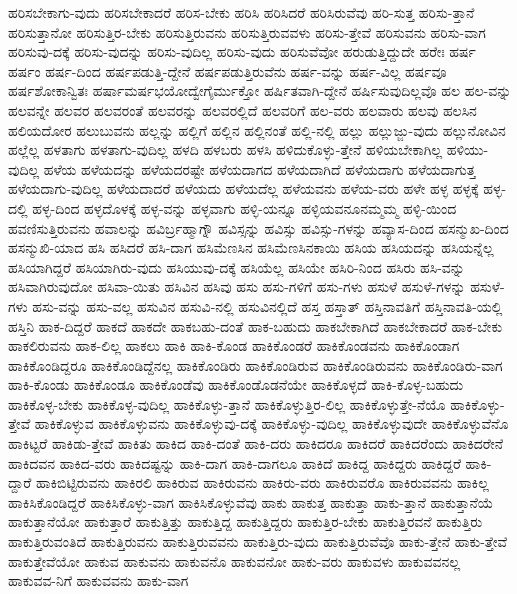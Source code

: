 {ಹರಿಸಬೇಕಾಗು-ವುದು
ಹರಿಸಬೇಕಾದರೆ
ಹರಿಸ-ಬೇಕು
ಹರಿಸಿ
ಹರಿಸಿದರೆ
ಹರಿಸಿರುವೆವು
ಹರಿ-ಸುತ್ತ
ಹರಿಸು-ತ್ತಾನೆ
ಹರಿಸುತ್ತಾನೋ
ಹರಿಸುತ್ತಿರ-ಬೇಕು
ಹರಿಸುತ್ತಿರುವನು
ಹರಿಸುತ್ತಿರುವವಳು
ಹರಿಸು-ತ್ತೇವೆ
ಹರಿಸುವನು
ಹರಿಸು-ವಾಗ
ಹರಿಸುವು-ದಕ್ಕೆ
ಹರಿಸು-ವುದನ್ನು
ಹರಿಸು-ವುದಿಲ್ಲ
ಹರಿಸು-ವುದು
ಹರಿಸುವೆವೋ
ಹರುಡುತ್ತಿದ್ದುದೇ
ಹರೇಃ
ಹರ್ಷ
ಹರ್ಷಂ
ಹರ್ಷ-ದಿಂದ
ಹರ್ಷಪಡುತ್ತಿ-ದ್ದೇನೆ
ಹರ್ಷಪಡುತ್ತಿರುವೆನು
ಹರ್ಷ-ವನ್ನು
ಹರ್ಷ-ವಿಲ್ಲ
ಹರ್ಷವೂ
ಹರ್ಷಶೋಕಾನ್ವಿತಃ
ಹರ್ಷಾಮರ್ಷಭಯೋದ್ವೇಗೈರ್ಮುಕ್ತೋ
ಹರ್ಷಿತವಾಗಿ-ದ್ದೇನೆ
ಹರ್ಷಿಸುವುದಿಲ್ಲವೊ
ಹಲ
ಹಲ-ವನ್ನು
ಹಲವನ್ನೇ
ಹಲವರ
ಹಲವರಂತೆ
ಹಲವರನ್ನು
ಹಲವರಲ್ಲಿದೆ
ಹಲವರಿಗೆ
ಹಲ-ವರು
ಹಲವಾರು
ಹಲವು
ಹಲಸಿನ
ಹಲಿಯದೋರ
ಹಲುಬುವನು
ಹಲ್ಲನ್ನು
ಹಲ್ಲಿಗೆ
ಹಲ್ಲಿನ
ಹಲ್ಲಿನಂತೆ
ಹಲ್ಲಿ-ನಲ್ಲಿ
ಹಲ್ಲು
ಹಲ್ಲುಜ್ಜು-ವುದು
ಹಲ್ಲುನೋವಿನ
ಹಲ್ಲೆಲ್ಲ
ಹಳತಾಗು
ಹಳತಾಗು-ವುದಿಲ್ಲ
ಹಳದಿ
ಹಳಬರು
ಹಳಸಿ
ಹಳಿದುಕೊಳ್ಳು-ತ್ತೇನೆ
ಹಳಿಯಬೇಕಾಗಿಲ್ಲ
ಹಳಿಯು-ವುದಿಲ್ಲ
ಹಳೆಯ
ಹಳೆಯದನ್ನು
ಹಳೆಯದರಷ್ಟೇ
ಹಳೆಯದಾಗದ
ಹಳೆಯದಾಗಿದೆ
ಹಳೆಯದಾಗು
ಹಳೆಯದಾಗುತ್ತ
ಹಳೆಯದಾಗು-ವುದಿಲ್ಲ
ಹಳೆಯದಾದರೆ
ಹಳೆಯದು
ಹಳೆಯದೆಲ್ಲ
ಹಳೆಯವನು
ಹಳೆಯ-ವರು
ಹಳೇ
ಹಳ್ಳ
ಹಳ್ಳಕ್ಕೆ
ಹಳ್ಳ-ದಲ್ಲಿ
ಹಳ್ಳ-ದಿಂದ
ಹಳ್ಳದೊಳಕ್ಕೆ
ಹಳ್ಳ-ವನ್ನು
ಹಳ್ಳವಾಗು
ಹಳ್ಳಿ-ಯನ್ನೂ
ಹಳ್ಳಿಯವನೂನಮ್ಮಮ್ಮ
ಹಳ್ಳಿ-ಯಿಂದ
ಹವಣಿಸುತ್ತಿರುವನು
ಹವಾಲನ್ನು
ಹವಿರ್ಬ್ರಹ್ಮಾಗ್ನೌ
ಹವಿಸ್ಸನ್ನು
ಹವಿಸ್ಸು
ಹವಿಸ್ಸು-ಗಳನ್ನು
ಹವ್ಯಾಸ-ದಿಂದ
ಹಸನ್ಮುಖ-ದಿಂದ
ಹಸನ್ಮುಖಿ-ಯಾದ
ಹಸಿ
ಹಸಿದರೆ
ಹಸಿ-ದಾಗ
ಹಸಿಮೆಣಸಿನ
ಹಸಿಮೆಣಸಿನಕಾಯಿ
ಹಸಿಯ
ಹಸಿಯದನ್ನು
ಹಸಿಯನ್ನೆಲ್ಲ
ಹಸಿಯಾಗಿದ್ದರೆ
ಹಸಿಯಾಗಿರು-ವುದು
ಹಸಿಯುವು-ದಕ್ಕೆ
ಹಸಿಯೆಲ್ಲ
ಹಸಿಯೇ
ಹಸಿರಿ-ನಿಂದ
ಹಸಿರು
ಹಸಿ-ವನ್ನು
ಹಸಿವಾಗಿರುವುದೋ
ಹಸಿವಾ-ಯಿತು
ಹಸಿವಿನ
ಹಸಿವು
ಹಸು
ಹಸು-ಗಳಿಗೆ
ಹಸು-ಗಳು
ಹಸುಳೆ
ಹಸುಳೆ-ಗಳನ್ನು
ಹಸುಳೆ-ಗಳು
ಹಸು-ವನ್ನು
ಹಸು-ವಲ್ಲ
ಹಸುವಿನ
ಹಸುವಿ-ನಲ್ಲಿ
ಹಸುವಿನಲ್ಲಿದೆ
ಹಸ್ತ
ಹಸ್ತಾತ್
ಹಸ್ತಿನಾವತಿಗೆ
ಹಸ್ತಿನಾವತಿ-ಯಲ್ಲಿ
ಹಸ್ತಿನಿ
ಹಾಕ-ದಿದ್ದರೆ
ಹಾಕದೆ
ಹಾಕದೇ
ಹಾಕಬಹು-ದಂತೆ
ಹಾಕ-ಬಹುದು
ಹಾಕಬೇಕಾಗಿದೆ
ಹಾಕಬೇಕಾದರೆ
ಹಾಕ-ಬೇಕು
ಹಾಕಲಿರುವನು
ಹಾಕ-ಲಿಲ್ಲ
ಹಾಕಲು
ಹಾಕಿ
ಹಾಕಿ-ಕೊಂಡ
ಹಾಕಿಕೊಂಡರೆ
ಹಾಕಿಕೊಂಡವನು
ಹಾಕಿಕೊಂಡಾಗ
ಹಾಕಿಕೊಂಡಿದ್ದರೂ
ಹಾಕಿಕೊಂಡಿದ್ದೆನಲ್ಲ
ಹಾಕಿಕೊಂಡಿರು
ಹಾಕಿಕೊಂಡಿರುವ
ಹಾಕಿಕೊಂಡಿರುವನು
ಹಾಕಿಕೊಂಡಿರು-ವಾಗ
ಹಾಕಿ-ಕೊಂಡು
ಹಾಕಿಕೊಂಡೂ
ಹಾಕಿಕೊಂಡೆವು
ಹಾಕಿಕೊಂಡೊಡನೆಯೇ
ಹಾಕಿಕೊಳ್ಳದೆ
ಹಾಕಿ-ಕೊಳ್ಳ-ಬಹುದು
ಹಾಕಿಕೊಳ್ಳ-ಬೇಕು
ಹಾಕಿಕೊಳ್ಳ-ವುದಿಲ್ಲ
ಹಾಕಿಕೊಳ್ಳು-ತ್ತಾನೆ
ಹಾಕಿಕೊಳ್ಳುತ್ತಿರ-ಲಿಲ್ಲ
ಹಾಕಿಕೊಳ್ಳುತ್ತೇ-ನೆಯೊ
ಹಾಕಿಕೊಳ್ಳು-ತ್ತೇವೆ
ಹಾಕಿಕೊಳ್ಳುವ
ಹಾಕಿಕೊಳ್ಳುವನು
ಹಾಕಿಕೊಳ್ಳುವು-ದಕ್ಕೆ
ಹಾಕಿಕೊಳ್ಳು-ವುದಿಲ್ಲ
ಹಾಕಿಕೊಳ್ಳುವುದೇ
ಹಾಕಿಕೊಳ್ಳುವೆನೊ
ಹಾಕಿಟ್ಟರೆ
ಹಾಕಿಡು-ತ್ತೇವೆ
ಹಾಕಿತು
ಹಾಕಿದ
ಹಾಕಿ-ದಂತೆ
ಹಾಕಿ-ದರು
ಹಾಕಿದರೂ
ಹಾಕಿದರೆ
ಹಾಕಿದರೆಂದು
ಹಾಕಿದರೇನೆ
ಹಾಕಿದವನ
ಹಾಕಿದ-ವರು
ಹಾಕಿದಷ್ಟನ್ನು
ಹಾಕಿ-ದಾಗ
ಹಾಕಿ-ದಾಗಲೂ
ಹಾಕಿದೆ
ಹಾಕಿದ್ದ
ಹಾಕಿದ್ದರು
ಹಾಕಿದ್ದರೆ
ಹಾಕಿ-ದ್ದಾರೆ
ಹಾಕಿಬಿಟ್ಟಿರುವನು
ಹಾಕಿರಲಿ
ಹಾಕಿರುವ
ಹಾಕಿರುವನು
ಹಾಕಿರು-ವರು
ಹಾಕಿರುವರೊ
ಹಾಕಿರುವವನು
ಹಾಕಿಲ್ಲ
ಹಾಕಿಸಿಕೊಂಡಿದ್ದರೆ
ಹಾಕಿಸಿಕೊಳ್ಳು-ವಾಗ
ಹಾಕಿಸಿಕೊಳ್ಳುವೆವು
ಹಾಕು
ಹಾಕುತ್ತ
ಹಾಕುತ್ತಾ
ಹಾಕು-ತ್ತಾನೆ
ಹಾಕುತ್ತಾನೆಯೆ
ಹಾಕುತ್ತಾನೆಯೋ
ಹಾಕುತ್ತಾರೆ
ಹಾಕುತ್ತಿತ್ತು
ಹಾಕುತ್ತಿದ್ದ
ಹಾಕುತ್ತಿದ್ದರು
ಹಾಕುತ್ತಿರ-ಬೇಕು
ಹಾಕುತ್ತಿರವನೆ
ಹಾಕುತ್ತಿರು
ಹಾಕುತ್ತಿರುವಂತಿದೆ
ಹಾಕುತ್ತಿರುವನು
ಹಾಕುತ್ತಿರುವವನು
ಹಾಕುತ್ತಿರು-ವುದು
ಹಾಕುತ್ತಿರುವೆವೊ
ಹಾಕು-ತ್ತೇನೆ
ಹಾಕು-ತ್ತೇವೆ
ಹಾಕುತ್ತೇವೆಯೋ
ಹಾಕುವ
ಹಾಕುವನು
ಹಾಕುವನೊ
ಹಾಕುವನೋ
ಹಾಕು-ವರು
ಹಾಕುವಳು
ಹಾಕುವವನಲ್ಲ
ಹಾಕುವವ-ನಿಗೆ
ಹಾಕುವವನು
ಹಾಕು-ವಾಗ
}
